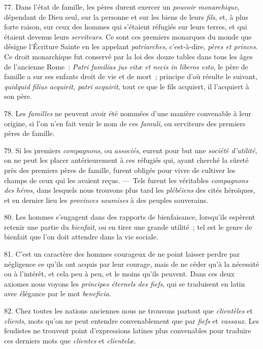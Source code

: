 \documentclass[french,twoside]{book} %
\begin{document}
77. Dans l’état de famille, les pères durent exercer un {\itshape pouvoir monarchique}, dépendant de Dieu seul, sur la personne et sur les biens de leurs {\itshape fils}, et, à plus forte raison, sur ceux des hommes qui s’étaient réfugiés sur leurs terres, et qui étaient devenus leurs {\itshape serviteurs}. Ce sont ces premiers monarques du monde que désigne l’Écriture Sainte en les  appelant {\itshape patriarches}, c’est-à-dire, {\itshape pères et princes}. Ce droit monarchique fut conservé par la loi des douze tables dans tous les âges de l’ancienne Rome : \emph{{\itshape Patri familias jus vitæ et necis in liberos esto}}, le père de famille a sur ses enfants droit de vie et de mort ; principe d’où résulte le suivant, \emph{{\itshape quidquid filius acquirit, patri acquirit}}, tout ce que le fils acquiert, il l’acquiert à son père.\par
78. Les {\itshape familles} ne peuvent avoir été nommées d’une manière convenable à leur origine, si l’on n’en fait venir le nom de ces {\itshape famuli}, ou serviteurs des premiers pères de famille.\par
79. Si les premiers {\itshape compagnons}, ou {\itshape associés}, eurent pour but une {\itshape société d’utilité}, on ne peut les placer antérieurement à ces réfugiés qui, ayant cherché la sûreté près des premiers pères de famille, furent obligés pour vivre de cultiver les champs de ceux qui les avaient reçus. — Tels furent les véritables {\itshape compagnons des héros}, dans lesquels nous trouvons plus tard les {\itshape plébéiens} des cités héroïques, et en dernier lieu les {\itshape provinces soumises} à des peuples souverains.\par
80. Les hommes s’engagent dans des rapports de bienfaisance, lorsqu’ils espèrent retenir une partie du {\itshape bienfait}, ou en tirer une grande utilité ; tel est le genre de bienfait que l’on doit attendre dans la vie sociale.\par
\par
 81. C’est un caractère des hommes courageux de ne point laisser perdre par négligence ce qu’ils ont acquis par leur courage, mais de ne céder qu’à la nécessité ou à l’intérêt, et cela peu à peu, et le moins qu’ils peuvent. Dans ces deux axiomes nous voyons les {\itshape principes éternels des fiefs}, qui se traduisent en latin avec élégance par le mot {\itshape beneficia}.\par
82. Chez toutes les nations anciennes nous ne trouvons partout que {\itshape clientèles} et {\itshape clients}, mots qu’on ne peut entendre convenablement que par {\itshape fiefs} et {\itshape vassaux}. Les feudistes ne trouvent point d’expressions latines plus convenables pour traduire ces derniers mots que {\itshape clientes} et {\itshape clientelæ}.\par
\end{document}
